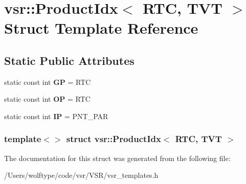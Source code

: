 \hypertarget{structvsr_1_1_product_idx_3_01_r_t_c_00_01_t_v_t_01_4}{\section{vsr\-:\-:Product\-Idx$<$ R\-T\-C, T\-V\-T $>$ Struct Template Reference}
\label{structvsr_1_1_product_idx_3_01_r_t_c_00_01_t_v_t_01_4}
}
\subsection*{Static Public Attributes}
\begin{DoxyCompactItemize}
\item 
\hypertarget{structvsr_1_1_product_idx_3_01_r_t_c_00_01_t_v_t_01_4_aad94cb3a0e4f2e00da45d8507dc6a344}{static const int {\bfseries G\-P} = R\-T\-C}\label{structvsr_1_1_product_idx_3_01_r_t_c_00_01_t_v_t_01_4_aad94cb3a0e4f2e00da45d8507dc6a344}

\item 
\hypertarget{structvsr_1_1_product_idx_3_01_r_t_c_00_01_t_v_t_01_4_a32071c7024f6746ceb4d5b5cde10d0e9}{static const int {\bfseries O\-P} = R\-T\-C}\label{structvsr_1_1_product_idx_3_01_r_t_c_00_01_t_v_t_01_4_a32071c7024f6746ceb4d5b5cde10d0e9}

\item 
\hypertarget{structvsr_1_1_product_idx_3_01_r_t_c_00_01_t_v_t_01_4_a868ab443579d0629e244e82da335408e}{static const int {\bfseries I\-P} = P\-N\-T\-\_\-\-P\-A\-R}\label{structvsr_1_1_product_idx_3_01_r_t_c_00_01_t_v_t_01_4_a868ab443579d0629e244e82da335408e}

\end{DoxyCompactItemize}
\subsubsection*{template$<$$>$ struct vsr\-::\-Product\-Idx$<$ R\-T\-C, T\-V\-T $>$}



The documentation for this struct was generated from the following file\-:\begin{DoxyCompactItemize}
\item 
/\-Users/wolftype/code/vsr/\-V\-S\-R/vsr\-\_\-templates.\-h\end{DoxyCompactItemize}
